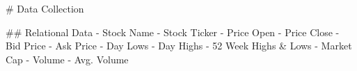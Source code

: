 # Data Collection

## Relational Data
- Stock Name
- Stock Ticker
- Price Open
- Price Close
- Bid Price
- Ask Price
- Day Lows
- Day Highs
- 52 Week Highs & Lows
- Market Cap
- Volume
- Avg. Volume 